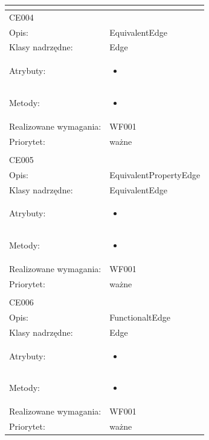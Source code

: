 \documentclass[a4paper,10pt]{article}
\begin{document}
\begin{center}
\begin{longtable}{|m{3cm}|m{9cm}|}
\multicolumn{2}{c}{} \\
 \hline

CE004 &  \\ \hline
Opis: & EquivalentEdge    \\ \hline
Klasy nadrzędne: & Edge    \\ \hline
Atrybuty: & \begin{itemize}
 \item 
\end{itemize}
 \\ \hline
Metody: & \begin{itemize}
 \item 
\end{itemize}
  \\ \hline
Realizowane wymagania: & WF001 \\ \hline
Priorytet: & ważne  \\ \hline

\multicolumn{2}{c}{} \\
 \hline

CE005 &  \\ \hline
Opis: & EquivalentPropertyEdge    \\ \hline
Klasy nadrzędne: & EquivalentEdge    \\ \hline
Atrybuty: & \begin{itemize}
 \item 
\end{itemize}
 \\ \hline
Metody: & \begin{itemize}
 \item 
\end{itemize}
  \\ \hline
Realizowane wymagania: & WF001 \\ \hline
Priorytet: & ważne  \\ \hline

\multicolumn{2}{c}{} \\
 \hline

CE006 &  \\ \hline
Opis: & FunctionaltEdge    \\ \hline
Klasy nadrzędne: & Edge    \\ \hline
Atrybuty: & \begin{itemize}
 \item 
\end{itemize}
 \\ \hline
Metody: & \begin{itemize}
 \item 
\end{itemize}
  \\ \hline
Realizowane wymagania: & WF001 \\ \hline
Priorytet: & ważne  \\ \hline


\end{longtable}
\end{center}
\end{document}
